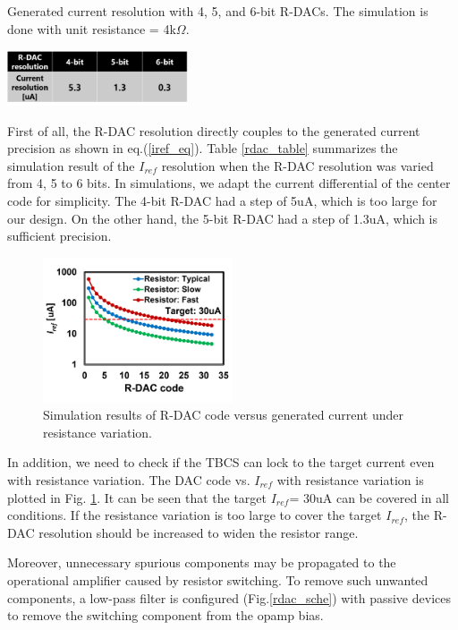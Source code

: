 \documentclass[paper]{ieice}
\begin{document}
\begin{table}[]
\centering
\caption{Generated current resolution with 4, 5, and 6-bit R-DACs. The simulation is done with unit resistance = 4k$\Omega$.}
 \includegraphics[width=0.4\textwidth]{figs/rdac_table.png}
  
\label{rdac_table}
\end{table}

First of all, the R-DAC resolution directly couples to the generated current precision as shown in eq.(\ref{iref_eq}). Table \ref{rdac_table} summarizes the simulation result of the $I_{ref}$ resolution when the R-DAC resolution was varied from 4, 5 to 6 bits. In simulations, we adapt the current differential of the center code for simplicity. The 4-bit R-DAC had a step of 5uA, which is too large for our design. On the other hand, the 5-bit R-DAC had a step of 1.3uA, which is sufficient precision.

\begin{figure}[!t]
\centering
 \includegraphics[width=0.5\textwidth]{figs/rdaccode.png}
  \caption{Simulation results of R-DAC code versus generated current under resistance variation.}
\label{rdac_pvt}
\end{figure}

In addition, we need to check if the TBCS can lock to the target current even with resistance variation. The DAC code vs. $I_{ref}$ with resistance variation is plotted in Fig. \ref{rdac_pvt}. It can be seen that the target $I_{ref}$= 30uA can be covered in all conditions. If the resistance variation is too large to cover the target $I_{ref}$, the R-DAC resolution should be increased to widen the resistor range.

Moreover, unnecessary spurious components may be propagated to the operational amplifier caused by resistor switching. To remove such unwanted components, a low-pass filter is configured (Fig.\ref{rdac_sche}) with passive devices to remove the switching component from the opamp bias.
\end{document}
